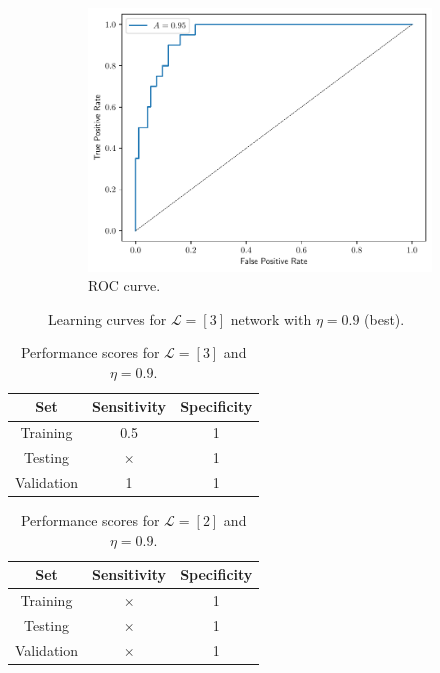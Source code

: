 \documentclass[conference]{IEEEtran}
\theoremstyle{definition}
\theoremstyle{remark}
\theoremstyle{remark}
\begin{document}
\begin{figure}
\begin{subfigure}[b]{0.32\textwidth}
        \includegraphics[width=\textwidth]{figs/3-0.9-roc.pdf}
        \caption{ROC curve.}
    \end{subfigure}
    \caption{Learning curves for $\mathcal{L}=[3]$ network with $\eta=0.9$
    (best).}
    \label{fig:NN-best}
\end{figure}

\begin{table}
\centering
\caption{Performance scores for $\mathcal{L}=[3]$ and $\eta=0.9$.}
\label{tab:L3}
\begin{tabular}{ccc}
\hline
\textbf{Set} & \textbf{Sensitivity} & \textbf{Specificity} \\ \hline
Training & 0.5 & 1 \\
Testing & $\times$ & 1 \\
Validation & 1 & 1 \\ \hline
\end{tabular}
\end{table}

\begin{table}
\centering
\caption{Performance scores for $\mathcal{L}=[2]$ and $\eta=0.9$.}
\label{tab:L2}
\begin{tabular}{ccc}
\hline
\textbf{Set} & \textbf{Sensitivity} & \textbf{Specificity} \\ \hline
Training & $\times$ & 1 \\
Testing & $\times$ & 1 \\
Validation & $\times$ & 1 \\ \hline
\end{tabular}
\end{table}
\end{document}
